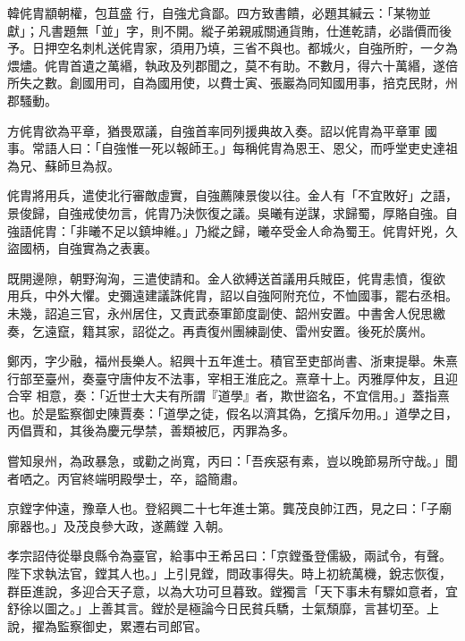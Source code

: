 \begin{pinyinscope}
 韓侂胄顓朝權，包苴盛
 行，自強尤貪鄙。四方致書饋，必題其緘云：「某物並獻」；凡書題無「並」字，則不開。縱子弟親戚關通貨賄，仕進乾請，必諧價而後予。日押空名刺札送侂胄家，須用乃填，三省不與也。都城火，自強所貯，一夕為煨燼。侂胄首遺之萬緡，執政及列郡聞之，莫不有助。不數月，得六十萬緡，遂倍所失之數。創國用司，自為國用使，以費士寅、張巖為同知國用事，掊克民財，州郡騷動。



 方侂胄欲為平章，猶畏眾議，自強首率同列援典故入奏。詔以侂胄為平章軍
 國事。常語人曰：「自強惟一死以報師王。」每稱侂胄為恩王、恩父，而呼堂吏史達祖為兄、蘇師旦為叔。



 侂胄將用兵，遣使北行審敵虛實，自強薦陳景俊以往。金人有「不宜敗好」之語，景俊歸，自強戒使勿言，侂胄乃決恢復之議。吳曦有逆謀，求歸蜀，厚賂自強。自強語侂胄：「非曦不足以鎮坤維。」乃縱之歸，曦卒受金人命為蜀王。侂胄奸兇，久盜國柄，自強實為之表裏。



 既開邊隙，朝野洶洶，三遣使請和。金人欲縛送首議用兵賊臣，侂胄恚憤，復欲
 用兵，中外大懼。史彌遠建議誅侂胄，詔以自強阿附充位，不恤國事，罷右丞相。未幾，詔追三官，永州居住，又責武泰軍節度副使、韶州安置。中書舍人倪思繳奏，乞遠竄，籍其家，詔從之。再責復州團練副使、雷州安置。後死於廣州。



 鄭丙，字少融，福州長樂人。紹興十五年進士。積官至吏部尚書、浙東提舉。朱熹行部至臺州，奏臺守唐仲友不法事，宰相王淮庇之。熹章十上。丙雅厚仲友，且迎合宰
 相意，奏：「近世士大夫有所謂『道學』者，欺世盜名，不宜信用。」蓋指熹也。於是監察御史陳賈奏：「道學之徒，假名以濟其偽，乞擯斥勿用。」道學之目，丙倡賈和，其後為慶元學禁，善類被厄，丙罪為多。



 嘗知泉州，為政暴急，或勸之尚寬，丙曰：「吾疾惡有素，豈以晚節易所守哉。」聞者哂之。丙官終端明殿學士，卒，謚簡肅。



 京鏜字仲遠，豫章人也。登紹興二十七年進士第。龔茂良帥江西，見之曰：「子廟廓器也。」及茂良參大政，遂薦鏜
 入朝。



 孝宗詔侍從舉良縣令為臺官，給事中王希呂曰：「京鏜蚤登儒級，兩試令，有聲。陛下求執法官，鏜其人也。」上引見鏜，問政事得失。時上初統萬機，銳志恢復，群臣進說，多迎合天子意，以為大功可旦暮致。鏜獨言「天下事未有驟如意者，宜舒徐以圖之。」上善其言。鏜於是極論今日民貧兵驕，士氣頹靡，言甚切至。上說，擢為監察御史，累遷右司郎官。




\end{pinyinscope}
